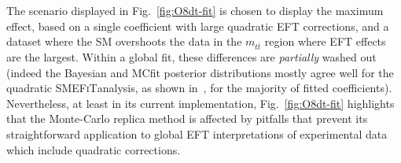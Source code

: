 \documentclass[withindex,glossary]{cam-thesis}
\newcommand{\smefit}{\textsc{SMEFiT}}
\begin{document}
The scenario displayed in Fig.~\ref{fig:O8dt-fit} is chosen to display the maximum effect,
based on a single coefficient with large quadratic EFT corrections, and a dataset
where the SM overshoots the data in the $m_{t\bar{t}}$ region where EFT effects
are the largest.
%
Within a global fit, these differences are \textit{partially} washed out
(indeed the Bayesian and MCfit posterior distributions mostly agree well for
the quadratic \smefit analysis, as shown in~\cite{Giani:2023gfq}, for the majority
of fitted coefficients).
%
Nevertheless, at least in its current implementation, Fig.~\ref{fig:O8dt-fit} highlights
that the Monte-Carlo replica method is affected by pitfalls that
prevent its straightforward application to global EFT interpretations of experimental
data which include quadratic corrections.




\end{document}
